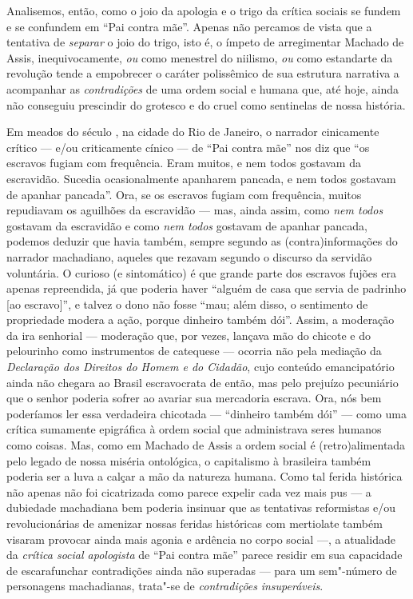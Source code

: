 Analisemos, então, como o joio da apologia e o trigo da crítica sociais
se fundem e se confundem em ``Pai contra mãe''. Apenas não percamos de
vista que a tentativa de \emph{separar} o joio do trigo, isto é, o
ímpeto de arregimentar Machado de Assis, inequivocamente, \emph{ou} como
menestrel do niilismo, \emph{ou} como estandarte da revolução tende a
empobrecer o caráter polissêmico de sua estrutura narrativa a acompanhar
as \emph{contradições} de uma ordem social e humana que, até hoje, ainda
não conseguiu prescindir do grotesco e do cruel como sentinelas de nossa
história.

\asterisc


Em meados do século , na cidade do Rio de Janeiro, o narrador
cinicamente crítico --- e/ou criticamente cínico --- de ``Pai contra mãe''
nos diz que ``os escravos fugiam com frequência. Eram muitos, e nem
todos gostavam da escravidão. Sucedia ocasionalmente apanharem pancada,
e nem todos gostavam de apanhar pancada''. Ora, se os escravos fugiam
com frequência, muitos repudiavam os aguilhões da escravidão --- mas,
ainda assim, como \emph{nem todos} gostavam da escravidão e como
\emph{nem todos} gostavam de apanhar pancada, podemos deduzir que havia
também, sempre segundo as (contra)informações do narrador machadiano,
aqueles que rezavam segundo o discurso da servidão voluntária. O curioso
(e sintomático) é que grande parte dos escravos fujões era apenas
repreendida, já que poderia haver ``alguém de casa que servia de
padrinho {[}ao escravo{]}'', e talvez o dono não fosse ``mau; além
disso, o sentimento de propriedade modera a ação, porque dinheiro também
dói''. Assim, a moderação da ira senhorial --- moderação que, por vezes,
lançava mão do chicote e do pelourinho como instrumentos de catequese ---
ocorria não pela mediação da \emph{Declaração dos Direitos do Homem e do
Cidadão}, cujo conteúdo emancipatório ainda não chegara ao Brasil
escravocrata de então, mas pelo prejuízo pecuniário que o senhor poderia
sofrer ao avariar sua mercadoria escrava. Ora, nós bem poderíamos ler
essa verdadeira chicotada --- ``dinheiro também dói'' --- como uma crítica
sumamente epigráfica à ordem social que administrava seres humanos como
coisas. Mas, como em Machado de Assis a ordem social é (retro)alimentada
pelo legado de nossa miséria ontológica, o capitalismo à brasileira
também poderia ser a luva a calçar a mão da natureza humana. Como tal
ferida histórica não apenas não foi cicatrizada como parece expelir cada
vez mais pus --- a dubiedade machadiana bem poderia insinuar que as
tentativas reformistas e/ou revolucionárias de amenizar nossas feridas
históricas com mertiolate também visaram provocar ainda mais agonia e
ardência no corpo social ---, a atualidade da \emph{crítica social
apologista} de ``Pai contra mãe'' parece residir em sua capacidade de
escarafunchar contradições ainda não superadas --- para um sem"-número de
personagens machadianas, trata"-se de \emph{contradições}
\emph{insuperáveis}.

